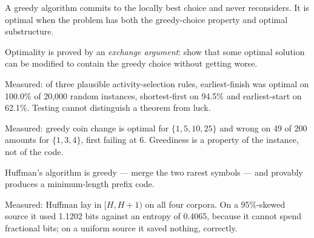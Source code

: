 \begin{chaptersummary}
\begin{tight}
  \item A greedy algorithm commits to the locally best choice and never
        reconsiders. It is optimal when the problem has both the greedy-choice
        property and optimal substructure.
  \item Optimality is proved by an \emph{exchange argument}: show that some
        optimal solution can be modified to contain the greedy choice without
        getting worse.
  \item Measured: of three plausible activity-selection rules, earliest-finish
        was optimal on 100.0\% of 20{,}000 random instances, shortest-first on
        94.5\% and earliest-start on 62.1\%. Testing cannot distinguish a
        theorem from luck.
  \item Measured: greedy coin change is optimal for $\{1,5,10,25\}$ and wrong
        on 49 of 200 amounts for $\{1,3,4\}$, first failing at 6. Greediness is
        a property of the instance, not of the code.
  \item Huffman's algorithm is greedy --- merge the two rarest symbols --- and
        provably produces a minimum-length prefix code.
  \item Measured: Huffman lay in $[H, H+1)$ on all four corpora. On a 95\%-skewed
        source it used 1.1202 bits against an entropy of 0.4065, because it
        cannot spend fractional bits; on a uniform source it saved nothing,
        correctly.
\end{tight}
\end{chaptersummary}

